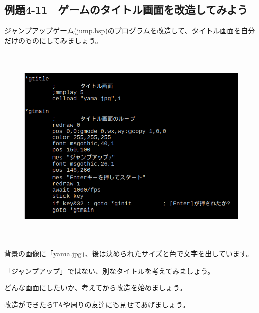 \newpage
\subsection{例題4-11　ゲームのタイトル画面を改造してみよう}


\begin{description}
    \item {}
\end{description}


ジャンプアップゲーム(jump.hsp)のプログラムを改造して、タイトル画面を自分だけのものにしてみましょう。

\begin{figure}[H]
    \begin{center}
      \includegraphics[keepaspectratio,width=14.42cm,height=9.791cm]{text04-img/s_jumptitlesrc.png}
    \end{center}
    \label{fig:prog_menu}
\end{figure}


\begin{description}
    \item {}
\end{description}

背景の画像に「yama.jpg」、後は決められたサイズと色で文字を出しています。

「ジャンプアップ」ではない、別なタイトルを考えてみましょう。

どんな画面にしたいか、考えてから改造を始めましょう。

改造ができたらTAや周りの友達にも見せてあげましょう。




